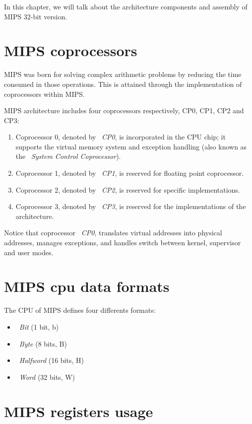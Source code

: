 \documentclass[
  oneside,
  11pt, a4paper,
  footinclude=true,
  headinclude=true,
  cleardoublepage=empty
]{scrbook}
\begin{document}
\newpage

In this chapter, we will talk about the architecture components and assembly of MIPS 32-bit version.

\section{MIPS coprocessors}

MIPS was born for solving complex arithmetic problems by reducing the time consumed in those operations.
This is attained through the implementation of coprocessors within MIPS.

MIPS architecture includes four coprocessors respectively, CP0, CP1, CP2 and CP3:

\begin{enumerate}
\item Coprocessor 0, denoted by ~\textit{CP0}, is incorporated in the CPU chip; it supports the virtual memory system and exception handling (also known as the ~\textit{System Control Coprocessor}).
\item Coprocessor 1, denoted by ~\textit{CP1}, is reserved for floating point coprocessor.
\item Coprocessor 2, denoted by ~\textit{CP2}, is reserved for specific implementations.
\item Coprocessor 3, denoted by ~\textit{CP3}, is reserved for the implementations of the architecture.
\end{enumerate}

Notice that coprocessor ~\textit{CP0}, translates virtual addresses into physical addresses, manages exceptions, and handles switch between kernel, supervisor and user modes.

\section{MIPS cpu data formats}

The CPU of MIPS defines four differents formats:
\begin{itemize}
\item ~\textit{Bit} (1 bit, b)
\item ~\textit{Byte} (8 bits, B)
\item ~\textit{Halfword} (16 bits, H)
\item ~\textit{Word} (32 bits, W)
\end{itemize}




\section{MIPS registers usage}
\end{document}
